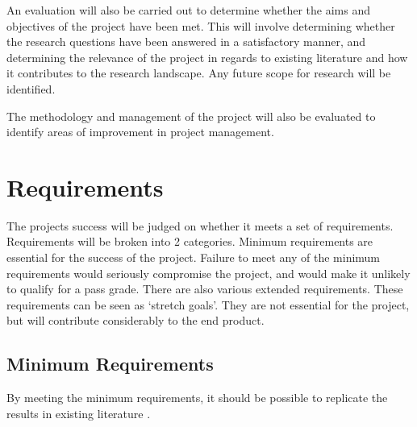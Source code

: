 An evaluation will also be carried out to determine whether the aims and objectives of the project have been met. This will involve determining whether the research questions have been answered in a satisfactory manner, and determining the relevance of the project in regards to existing literature and how it contributes to the research landscape. Any future scope for research will be identified. 

The methodology and management of the project will also be evaluated to identify areas of improvement in project management.

\section{Requirements}
The projects success will be judged on whether it meets a set of requirements. Requirements will be broken into 2 categories. Minimum requirements are essential for the success of the project. Failure to meet any of the minimum requirements would seriously compromise the project, and would make it unlikely to qualify for a pass grade. There are also various extended requirements. These requirements can be seen as `stretch goals'. They are not essential for the project, but will contribute considerably to the end product.

\subsection{Minimum Requirements}
By meeting the minimum requirements, it should be possible to replicate the results in existing literature \cite{warneke2011exploiting}. 

